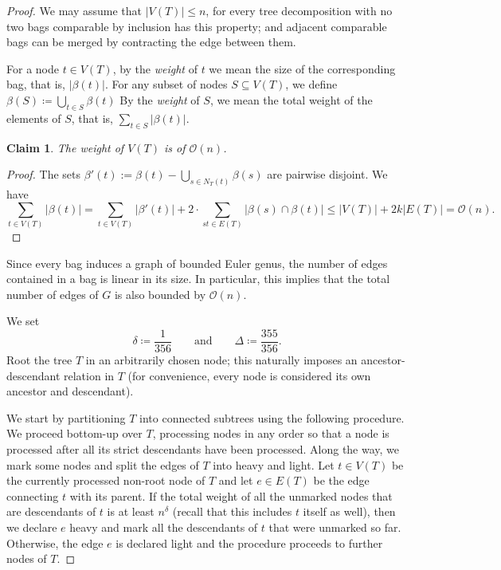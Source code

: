 \documentclass[11pt,a4paper]{article}
\newtheorem{claim}{Claim}[section]
\newcommand{\Oh}{\mathcal{O}}
\renewcommand{\leq}{\leqslant}
\begin{document}
\begin{proof}
We may assume that $|V(T)|\leq n$, for every tree decomposition with no two bags comparable by inclusion has this property; and adjacent comparable bags can be merged by contracting the edge between them.

For a node $t\in V(T)$, by the {\em{weight}} of $t$ we mean the size of the corresponding bag, that is, $|\beta(t)|$. For any subset of nodes $S \subseteq V(T)$, we define $\beta(S) \coloneqq \bigcup_{t \in S} \beta(t)$ By the {\em{weight}} of $S$, we mean the total weight of the elements of $S$, that is, $\sum_{t\in S} |\beta(t)|$. 

\begin{claim}\label{cl:weight-T}
The weight of $V(T)$ is of $\Oh(n)$.
\end{claim}

\begin{proof}
The sets $\beta'(t) := \beta(t) - \bigcup_{s \in N_T(t)} \beta(s)$ are pairwise disjoint. We have
$$
\sum_{t \in V(T)} |\beta(t)| =
\sum_{t \in V(T)} |\beta'(t)| + 2 \cdot \sum_{st \in E(T)} |\beta(s) \cap \beta(t)| \leq
|V(T)| + 2k|E(T)| = \Oh(n).
$$
\end{proof}

Since every bag induces a graph of bounded Euler genus, the number of edges contained in a bag is linear in its size. In particular, this implies that the total number of edges of $G$ is also bounded by $\Oh(n)$.

We set $$\delta \coloneqq \frac{1}{356}\qquad\textrm{and}\qquad \Delta \coloneqq \frac{355}{356}.$$ Root the tree $T$ in an arbitrarily chosen node; this naturally imposes an ancestor-descendant relation in $T$ (for convenience, every node is considered its own ancestor and descendant).

We start by partitioning $T$ into connected subtrees using the following procedure.
We proceed bottom-up over $T$, processing nodes in any order so that a node is processed after all its strict descendants have been processed. Along the way, we mark some nodes and split the edges of $T$ into heavy and light. Let $t \in V(T)$ be the currently processed non-root node of $T$ and let $e \in E(T)$ be the edge connecting $t$ with its parent. If the total weight of all the unmarked nodes that are descendants of $t$ is at least $n^\delta$ (recall that this includes $t$ itself as well), then we declare $e$ heavy and mark all the descendants of $t$ that were unmarked so far. Otherwise, the edge $e$ is declared light and the procedure proceeds to further nodes of $T$.


\end{proof}
\end{document}
